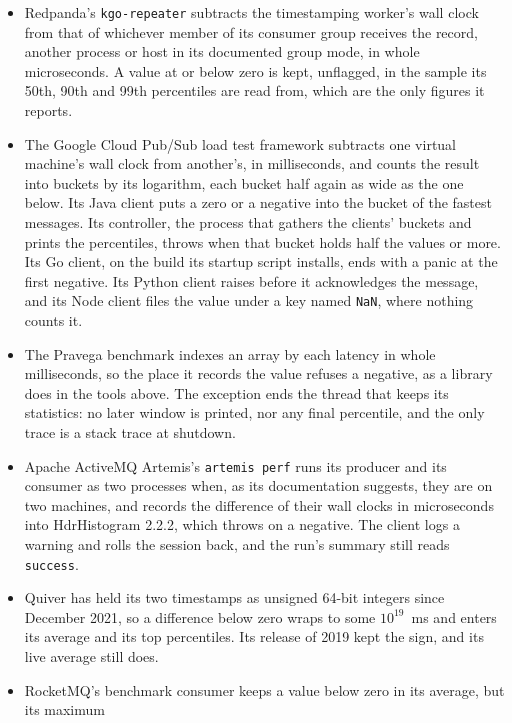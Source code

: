 \documentclass[10pt,journal,onecolumn]{IEEEtran}
\begin{document}
\begin{itemize}
kept out of its minimum, maximum, mean and percentiles, and every report prints how many as
invalid latencies; a zero is kept. Its default timestamps are
wall-clock milliseconds, and its multi-host mode lets one host subtract another's timestamp, which
no document mentions.
\item Redpanda's \texttt{kgo-repeater} subtracts the timestamping worker's wall clock from that of
whichever member of its consumer group receives the record, another process or host in its
documented group mode, in whole microseconds. A value at or below zero is kept, unflagged, in the
sample its 50th, 90th and 99th percentiles are read from, which are the only figures it reports.
\item The Google Cloud Pub/Sub load test framework subtracts one virtual machine's wall clock from
another's, in milliseconds, and counts the result into buckets by its logarithm, each bucket half
again as wide as the one below. Its Java client puts a zero or a negative into the bucket of the
fastest messages. Its controller, the process that gathers the clients' buckets and prints the
percentiles, throws when that bucket holds half the values or more. Its Go client, on the build its
startup script installs, ends with a panic at the first negative. Its Python client raises before
it acknowledges the message, and its Node client files the value under a key named
\texttt{NaN}, where nothing counts it.
\item The Pravega benchmark indexes an array by each latency in whole milliseconds, so the place
it records the value refuses a negative, as a library does in the tools above. The exception ends
the thread that keeps its statistics: no later window is printed, nor any final percentile, and the
only trace is a stack trace at shutdown.
\item Apache ActiveMQ Artemis's \texttt{artemis perf} runs its producer and its consumer as two
processes when, as its documentation suggests, they are on two machines, and records the
difference of their wall clocks in microseconds into HdrHistogram 2.2.2, which throws on a
negative. The client logs a warning and rolls the session back, and the run's summary still reads
\texttt{success}.
\item Quiver has held its two timestamps as unsigned 64-bit integers since December 2021, so a
difference below zero wraps to some $10^{19}$~ms and enters its average and its top percentiles.
Its release of 2019 kept the sign, and its live average still does.
\item RocketMQ's benchmark consumer keeps a value below zero in its average, but its maximum

\end{itemize}
\end{document}
